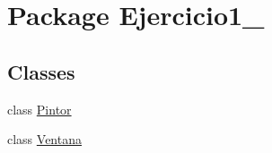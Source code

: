 \hypertarget{namespace_ejercicio1__3}{}\section{Package Ejercicio1\+\_}
\label{namespace_ejercicio1__3}
\subsection*{Classes}
\begin{DoxyCompactItemize}
\item 
class \mbox{\hyperlink{class_ejercicio1__3_1_1_pintor}{Pintor}}
\item 
class \mbox{\hyperlink{class_ejercicio1__3_1_1_ventana}{Ventana}}
\end{DoxyCompactItemize}
